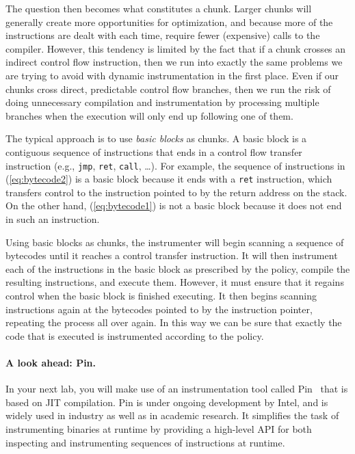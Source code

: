 \documentclass[11pt,twoside]{scrartcl}
\begin{document}
The question then becomes what constitutes a chunk. Larger chunks will generally create more opportunities for optimization, and because more of the instructions are dealt with each time, require fewer (expensive) calls to the compiler. However, this tendency is limited by the fact that if a chunk crosses an indirect control flow instruction, then we run into exactly the same problems we are trying to avoid with dynamic instrumentation in the first place. Even if our chunks cross direct, predictable control flow branches, then we run the risk of doing unnecessary compilation and instrumentation by processing multiple branches when the execution will only end up following one of them.

The typical approach is to use \emph{basic blocks} as chunks. A basic block is a contiguous sequence of instructions that ends in a control flow transfer instruction (e.g., \verb'jmp', \verb'ret', \verb'call', \ldots). For example, the sequence of instructions in (\ref{eq:bytecode2}) is a basic block because it ends with a \verb'ret' instruction, which transfers control to the instruction pointed to by the return address on the stack. On the other hand, (\ref{eq:bytecode1}) is not a basic block because it does not end in such an instruction.

Using basic blocks as chunks, the instrumenter will begin scanning a sequence of bytecodes until it reaches a control transfer instruction. It will then instrument each of the instructions in the basic block as prescribed by the policy, compile the resulting instructions, and execute them. However, it must ensure that it regains control when the basic block is finished executing. It then begins scanning instructions again at the bytecodes pointed to by the instruction pointer, repeating the process all over again. In this way we can be sure that exactly the code that is executed is instrumented according to the policy.

\paragraph{A look ahead: Pin.} In your next lab, you will make use of an instrumentation tool called Pin~\cite{Luk2005} that is based on JIT compilation. Pin is under ongoing development by Intel, and is widely used in industry as well as in academic research. It simplifies the task of instrumenting binaries at runtime by providing a high-level API for both inspecting and instrumenting sequences of instructions at runtime. 
\end{document}
